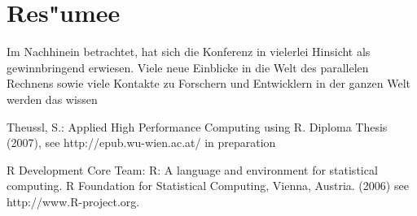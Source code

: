 \documentclass[a4paper,fleqn]{article}
\begin{document}
\section{Res"umee}

Im Nachhinein betrachtet, hat sich die Konferenz in vielerlei Hinsicht
als gewinnbringend erwiesen. Viele neue Einblicke in die Welt des
parallelen Rechnens sowie viele Kontakte zu Forschern und Entwicklern
in der ganzen Welt werden das wissen


\begin{thebibliography}{2}
%
Theussl, S.:
Applied High Performance Computing using R.
Diploma Thesis (2007), see http://epub.wu-wien.ac.at/ in preparation

R Development Core Team:
R: A language and environment for statistical computing. R Foundation
for Statistical Computing, Vienna, Austria. (2006)
see http://www.R-project.org.

\end{thebibliography}
\end{document}
